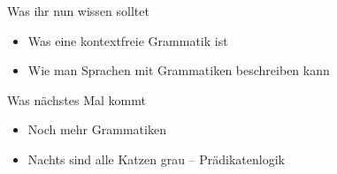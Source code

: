 \begin{frame}
	\begin{block}{Was ihr nun wissen solltet}
		\begin{itemize}
			\item Was eine kontextfreie Grammatik ist
			\item Wie man Sprachen mit Grammatiken beschreiben kann
		\end{itemize}
	\end{block}
	
	\begin{block}{Was nächstes Mal kommt}
		\begin{itemize}
			\item Noch mehr Grammatiken
			\item Nachts sind alle Katzen grau -- Prädikatenlogik
		\end{itemize}
	\end{block}
\end{frame}	







\backupend
